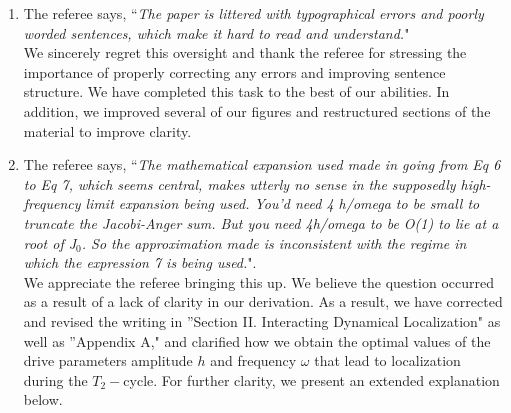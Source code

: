 \documentclass[aps,prb,reprint,showpacs,floatfix,superscriptaddress, onecolumn, nofootinbib, 9pt]{revtex4-2}
\newcommand{\ar}[1]{{\color{blue}#1}} %
\begin{document}
\begin{enumerate}
    \item The referee says, ``\textit{The paper is littered with typographical errors and poorly worded sentences, which make it hard to read and understand.}"\\

    \ar{
We sincerely regret this oversight and thank the referee for stressing the importance of properly correcting any errors and improving sentence structure. We have completed this task to the best of our abilities. In addition, we improved several of our figures and restructured sections of the material to improve clarity.
    }
    \item The referee says, ``\textit{The mathematical
    expansion used made in going from Eq 6 to Eq 7, which seems central, makes utterly no sense in the supposedly high-frequency limit expansion being used. You'd need 4 h/omega to be small to truncate the Jacobi-Anger sum. But you need 4h/omega to be O(1) to lie at a root of J$_0$. So the approximation made is inconsistent with the regime in which the expression 7 is being used.}".\\

    \ar{
We appreciate the referee bringing this up. We believe the question occurred as a result of a lack of clarity in our derivation. As a result, we have corrected and revised the writing in ''Section II. Interacting Dynamical Localization" as well as ''Appendix A," and clarified how we obtain the optimal values of the drive parameters amplitude $h$ and frequency $\omega$ that lead to localization during the $T_2-$cycle. For further clarity, we present an extended explanation below.\\

}
\end{enumerate}
\end{document}
